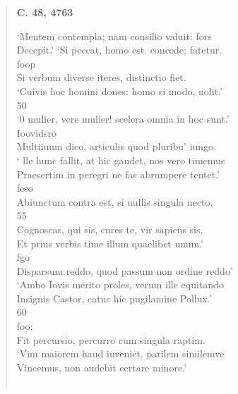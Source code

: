 \documentclass[11pt, a4paper]{report}
\begin{document}
\begin{verse}
    \begin{center} \textbf{C. 48, 4763} \end{center} \marginpar{[10]} ‘Mentem contempla; nam consilio valuit: fors \\ Decepit.’ ‘Si peccat, homo est. concede; fatetur. \\ foop \\ Si verbum diverse iteres, distinctio fiet. \\ ‘Cuivis hoc homini dones: homo si modo, nolit.’ \\ 50 \\ ‘0 mulier, vere mulier! scelera omnia in hoc sunt.’ \\ Ioovidsro \\ Multiiuum dico, articulis quod pluribu’ iungo. \\ ‘ \lbrack lle hunc fallit, at hic gaudet, nos vero timemus \\ Praesertim in peregri ne fas abrumpere tentet.’ \\ feso \\ Abiunctum contra est, si nullis singula necto. \\ 55 \\ Cognoscas, qui sis, cnres te, vir sapiens sis, \\ Et prius verbis time illum quaelibet unum.’ \\ fgo \\ Disparsum reddo, quod passum non ordine reddo’ \\ ‘Ambo Iovis merito proles, verum ille equitando \\ Insignis Castor, catns hic pugilamine Pollux.’ \\ 60 \\ foo: \\ Fit percursio, percurro cum singula raptim. \\ ‘Vim maiorem haud inveniet, parilem similemve \\ Vincemus, non audebit certare minore.’ \\ 
        ﻿\pagebreak 

\end{verse}
\end{document}
